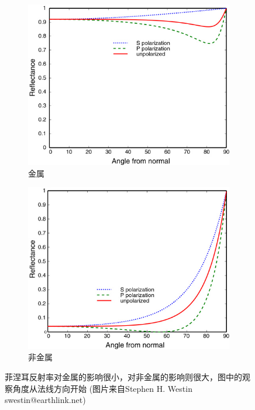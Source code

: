 \begin{figure}
\begin{fullwidth}
	\begin{subfigure}[b]{0.5\thewidth}
		\includegraphics[width=1.\textwidth]{figures/intro/fresnel-1}
		\caption{金属}
	\end{subfigure}
	\begin{subfigure}[b]{0.5\thewidth}
		\includegraphics[width=1.\textwidth]{figures/intro/fresnel-2}
		\caption{非金属}
	\end{subfigure}
\caption{菲涅耳反射率对金属的影响很小，对非金属的影响则很大，图中的观察角度从法线方向开始 (图片来自Stephen H. Westin swestin@earthlink.net)}
\label{f:intro-fresnel-diff}
\end{fullwidth}
\end{figure}

